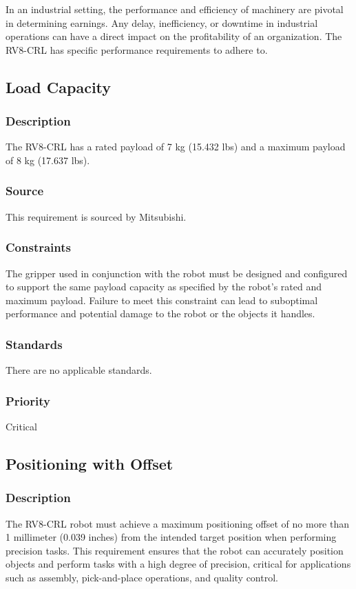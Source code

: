 In an industrial setting, the performance and efficiency of machinery are pivotal in determining earnings. Any delay, inefficiency, or downtime in industrial operations can have a direct impact on the profitability of an organization. The RV8-CRL has specific performance requirements to adhere to.

\subsection{Load Capacity}
\subsubsection{Description}
The RV8-CRL has a rated payload of 7 kg (15.432 lbs) and a maximum payload of 8 kg (17.637 lbs).
\subsubsection{Source}
This requirement is sourced by Mitsubishi.
\subsubsection{Constraints}
The gripper used in conjunction with the robot must be designed and configured to support the same payload capacity as specified by the robot's rated and maximum payload. Failure to meet this constraint can lead to suboptimal performance and potential damage to the robot or the objects it handles.
\subsubsection{Standards}
There are no applicable standards.
\subsubsection{Priority}
Critical

\subsection{Positioning with Offset}
\subsubsection{Description}
The RV8-CRL robot must achieve a maximum positioning offset of no more than 1 millimeter (0.039 inches) from the intended target position when performing precision tasks. This requirement ensures that the robot can accurately position objects and perform tasks with a high degree of precision, critical for applications such as assembly, pick-and-place operations, and quality control.
